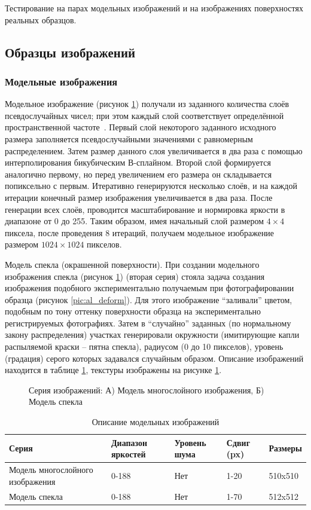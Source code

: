 Тестирование  на парах модельных изображений и на изображениях поверхностях реальных образцов.
\subsection{Образцы изображений}
\subsubsection{Модельные изображения}\label{mod_image}

Модельное изображение (рисунок \ref{pic:gray_mix}) получали из заданного количества слоёв псевдослучайных чисел; при этом каждый слой соответствует определённой пространственной частоте~\cite{pan_15}. Первый слой некоторого заданного исходного размера заполняется псевдослучайными значениями с равномерным распределением. Затем размер данного слоя увеличивается в два раза с помощью интерполирования бикубическим В-сплайном. Второй слой формируется аналогично первому, но перед увеличением его размера он складывается попиксельно с первым. Итеративно генерируются несколько слоёв, и на каждой итерации конечный размер изображения увеличивается в два раза. После генерации всех слоёв, проводится масштабирование и нормировка яркости в диапазоне от 0 до 255. Таким образом, имея начальный слой размером $4 \times 4$ пиксела, после проведения 8 итераций, получаем модельное изображение размером $1024 \times 1024$ пикселов.

Модель спекла (окрашенной поверхности). При создании модельного изображения спекла (рисунок \ref{pic:gray_mix}) (вторая серия) стояла задача создания изображения подобного экспериментально получаемым при фотографировании образца (рисунок \ref{pic:al_deform}). Для этого изображение ``заливали'' цветом, подобным по тону оттенку поверхности образца на экспериментально регистрируемых фотографиях. Затем в ``случайно'' заданных (по нормальному закону распределения) участках генерировали окружности (имитирующие капли распыляемой краски – пятна спекла), радиусом (0 до 10 пикселов), уровень (градация) серого которых задавался случайным образом. Описание изображений находится в таблице \ref{tab:set_image}, текстуры изображены на рисунке \ref{pic:gray_mix}.

\begin{figure}[h!]
\caption{Серия изображений: А) Модель многослойного изображения, Б) Модель спекла}
\label{pic:gray_mix}
\end{figure}

\begin{longtable}[h!]{|m{}|m{}|m{}|m{}|m{}|}
\caption{Описание модельных изображений}
\label{tab:set_image}
\\ \hline
Серия & Диапазон яркостей 	& Уровень шума & Сдвиг (px) &  Размеры \\ \hline
Модель многослойного изображения & 0-188 & Нет & 1-20 &  510x510 \\ \hline
Модель спекла & 0-188 & Нет & 1-70 &  512x512 \\ \hline
\end{longtable}

